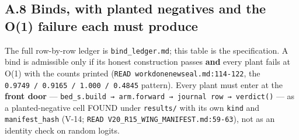 \documentclass[11pt,a4paper]{article}
\theoremstyle{plain}
\theoremstyle{definition}
\theoremstyle{remark}
\begin{document}
\subsection{A.8 Binds, with planted negatives and the O(1) failure each
must
produce}\label{a.8-binds-with-planted-negatives-and-the-o1-failure-each-must-produce}

The full row-by-row ledger is \texttt{bind\_ledger.md}; this table is
the specification. A bind is admissible only if its honest construction
passes \textbf{and} every plant fails at O(1) with the counts printed
(\texttt{READ\ workdonenewseal.md:114-122}, the
\texttt{0.9749\ /\ 0.9165\ /\ 1.000\ /\ 0.4845} pattern). Every plant
must enter at the \textbf{front door} ---
\texttt{bed\_s.build\ →\ arm.forward\ →\ journal\ row\ →\ verdict()} ---
as a planted-negative cell FOUND under \texttt{results/} with its own
\texttt{kind} and \texttt{manifest\_hash} (V-14;
\texttt{READ\ V20\_R15\_WING\_MANIFEST.md:59-63}), not as an identity
check on random logits.
\end{document}
